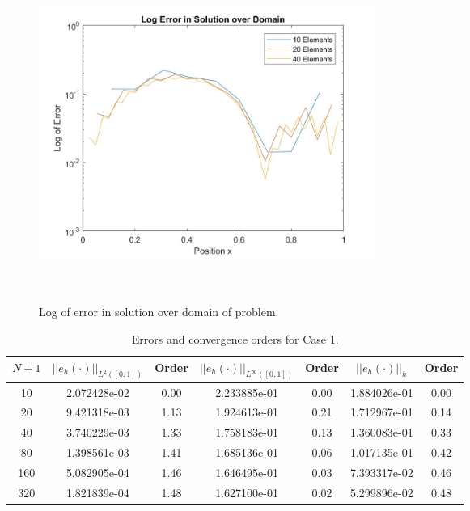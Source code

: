 \documentclass[a4paper, 12pt]{article}
\begin{document}
\begin{figure}[H]
  \centering
  \includegraphics[width=11cm, height=11cm]{Log_error}
  \caption{ Log of error in solution over domain of problem.}
  \label{fig:Error2}
\end{figure}

\begin{table}[!ht]
\caption{Errors and convergence orders for Case 1.}
\vspace{0.1in}
\centering
\begin{tabular}{|c|c|c| c| c| c| c|}
\hline
 $N+1$&  $||e_h(\cdot)||_{L^2([0,1])}$ & Order  & $||e_h(\cdot)||_{L^\infty([0,1])}$ & Order& $||e_h(\cdot)||_h$& Order \\
 \hline
     10  &  2.072428e-02 & 0.00 & 2.233885e-01 & 0.00 & 1.884026e-01 & 0.00\\
     20  &  9.421318e-03 & 1.13 & 1.924613e-01 & 0.21 & 1.712967e-01 & 0.14\\
     40  &  3.740229e-03 & 1.33 & 1.758183e-01 & 0.13 & 1.360083e-01 & 0.33\\
     80  &  1.398561e-03 & 1.41 & 1.685136e-01 & 0.06 & 1.017135e-01 & 0.42\\
     160 &  5.082905e-04 & 1.46 & 1.646495e-01 & 0.03 & 7.393317e-02 & 0.46\\
     320 &  1.821839e-04 & 1.48 & 1.627100e-01 & 0.02 & 5.299896e-02 & 0.48\\
\hline
\end{tabular}
\label{tab:C1}
\end{table}
\end{document}

